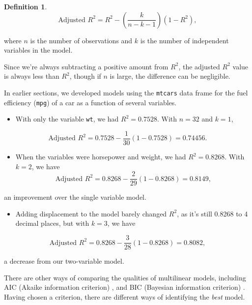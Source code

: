 \documentclass[
]{book}
\providecommand{\tightlist}{%
  \setlength{\itemsep}{0pt}\setlength{\parskip}{0pt}}
\theoremstyle{definition}
\newtheorem{definition}{Definition}[chapter]
\theoremstyle{definition}
\theoremstyle{definition}
\theoremstyle{definition}
\theoremstyle{remark}
\begin{document}
\begin{defbox}

\begin{definition}
\[\text{Adjusted } R^2=R^2-\left(\frac{k}{n-k-1}\right)(1-R^2),
\]

where \(n\) is the number of observations and \(k\) is the number of independent variables in the model.
\end{definition}

\end{defbox}

Since we're always subtracting a positive amount from \(R^2\), the adjusted \(R^2\) value is always less than \(R^2\), though if \(n\) is large, the difference can be negligible.

In earlier sections, we developed models using the \texttt{mtcars} data frame for the fuel efficiency (\texttt{mpg}) of a car as a function of several variables.

\begin{itemize}
\tightlist
\item
  With only the variable \texttt{wt}, we had \(R^2=0.7528\). With \(n=32\) and \(k=1\),
\end{itemize}

\[\text{Adjusted } R^2=0.7528-\frac{1}{30}(1-0.7528)=0.74456.\]

\begin{itemize}
\tightlist
\item
  When the variables were horsepower and weight, we had \(R^2=0.8268\). With \(k=2\), we have \[\text{Adjusted }R^2=0.8268-\frac{2}{29}(1-0.8268)=0.8149,\]
\end{itemize}

an improvement over the single variable model.

\begin{itemize}
\tightlist
\item
  Adding displacement to the model barely changed \(R^2\), as it's still 0.8268 to 4 decimal places, but with \(k=3\), we have
\end{itemize}

\[ \text{Adjusted } R^2=0.8268-\frac{3}{28}(1-0.8268)=0.8082,\]

a decrease from our two-variable model.

There are other ways of comparing the qualities of multilinear models, including AIC (Akaike information criterion) \autocite{AIC}, and BIC (Bayesian information criterion) \autocite{BIC}. Having chosen a criterion, there are different ways of identifying the \emph{best} model.
\end{document}
